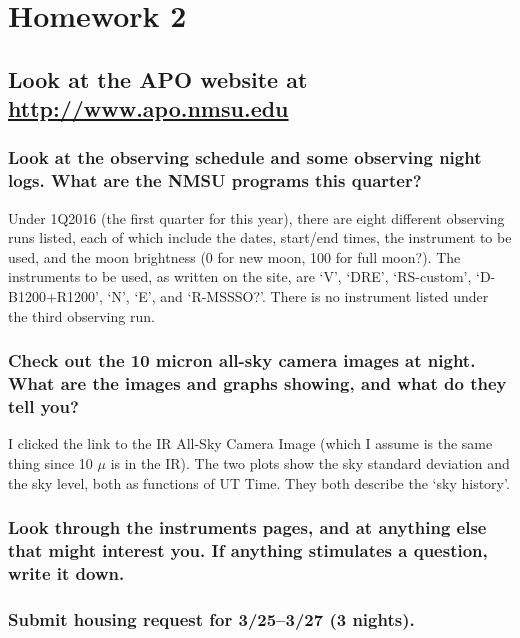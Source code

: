 \documentclass[12pt]{article}
\begin{document}
\section*{Homework 2}
\subsection*{Look at the APO website at
\textcolor{blue}{\url{http://www.apo.nmsu.edu}}}

\subsubsection*{Look at the observing schedule and some observing night logs.
    What are the NMSU programs this quarter?}

    Under 1Q2016 (the first quarter for this year), there are eight different
    observing runs listed, each of which include the dates, start/end times,
    the instrument to be used, and the moon brightness (0 for new moon,
    100 for full moon?).
    The instruments to be used, as written on the site, are
    `V', `DRE', `RS-custom', `D-B1200+R1200', `N', `E', and `R-MSSSO?'.
    There is no instrument listed under the third observing run.


\subsubsection*{Check out the 10 micron all-sky camera images at night. What are
    the images and graphs showing, and what do they tell you?}

    I clicked the link to the IR All-Sky Camera Image (which I assume is the
    same thing since 10 $\mu$ is in the IR). The two plots show the sky
    standard deviation and the sky level, both as functions of UT Time.
    They both describe the `sky history'.


\subsubsection*{Look through the instruments pages, and at anything else that might
    interest you. If anything stimulates a question, write it down.}

\subsubsection*{Submit housing request for 3/25--3/27 (3 nights).}
\end{document}
